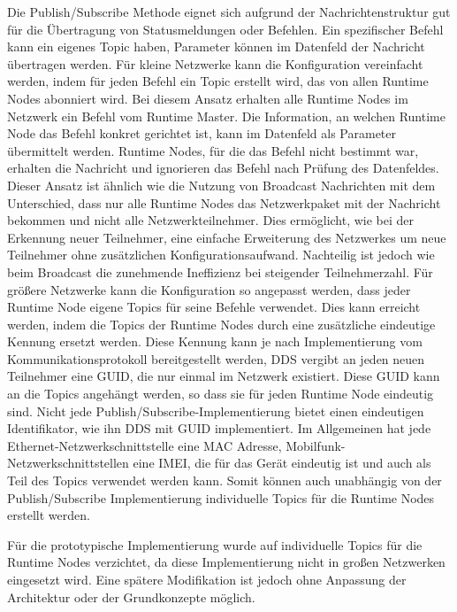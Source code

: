 Die Publish/Subscribe Methode eignet sich aufgrund der Nachrichtenstruktur gut für die Übertragung von Statusmeldungen oder Befehlen. Ein spezifischer Befehl kann ein eigenes Topic haben, Parameter können im Datenfeld der Nachricht übertragen werden. Für kleine Netzwerke kann die Konfiguration vereinfacht werden, indem für jeden Befehl ein Topic erstellt wird, das von allen Runtime Nodes abonniert wird. Bei diesem Ansatz erhalten alle Runtime Nodes im Netzwerk ein Befehl vom Runtime Master. Die Information, an welchen Runtime Node das Befehl konkret gerichtet ist, kann im Datenfeld als Parameter übermittelt werden. Runtime Nodes, für die das Befehl nicht bestimmt war, erhalten die Nachricht und ignorieren das Befehl nach Prüfung des Datenfeldes. Dieser Ansatz ist ähnlich wie die Nutzung von Broadcast Nachrichten mit dem Unterschied, dass nur alle Runtime Nodes das Netzwerkpaket mit der Nachricht bekommen und nicht alle Netzwerkteilnehmer. Dies ermöglicht, wie bei der Erkennung neuer Teilnehmer, eine einfache Erweiterung des Netzwerkes um neue Teilnehmer ohne zusätzlichen Konfigurationsaufwand. Nachteilig ist jedoch wie beim Broadcast die zunehmende Ineffizienz bei steigender Teilnehmerzahl. Für größere Netzwerke kann die Konfiguration so angepasst werden, dass jeder Runtime Node eigene Topics für seine Befehle verwendet. Dies kann erreicht werden, indem die Topics der Runtime Nodes durch eine zusätzliche eindeutige Kennung ersetzt werden. Diese Kennung kann je nach Implementierung vom Kommunikationsprotokoll bereitgestellt werden, \gls{DDS} vergibt an jeden neuen Teilnehmer eine \gls{GUID}, die nur einmal im Netzwerk existiert. Diese GUID kann an die Topics angehängt werden, so dass sie für jeden Runtime Node eindeutig sind. Nicht jede Publish/Subscribe-Implementierung bietet einen eindeutigen Identifikator, wie ihn \gls{DDS} mit \gls{GUID} implementiert. Im Allgemeinen hat jede Ethernet-Netzwerkschnittstelle eine \gls{MAC} Adresse, Mobilfunk-Netzwerkschnittstellen eine \gls{IMEI}, die für das Gerät eindeutig ist und auch als Teil des Topics verwendet werden kann. Somit können auch unabhängig von der Publish/Subscribe Implementierung individuelle Topics für die Runtime Nodes erstellt werden. 

Für die prototypische Implementierung wurde auf individuelle Topics für die Runtime Nodes verzichtet, da diese Implementierung nicht in großen Netzwerken eingesetzt wird. Eine spätere Modifikation ist jedoch ohne Anpassung der Architektur oder der Grundkonzepte möglich. 

